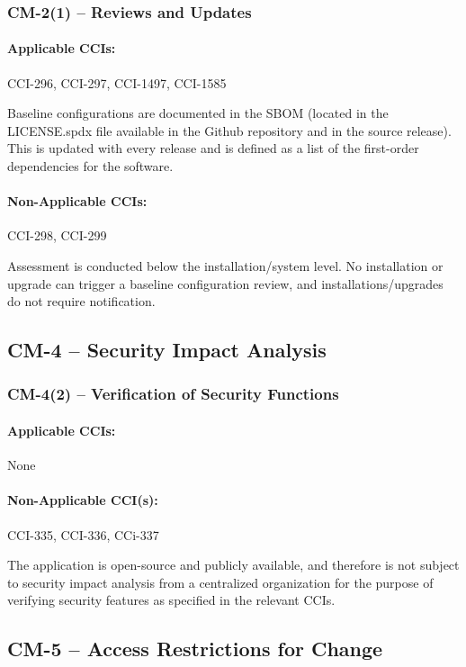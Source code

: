 \documentclass[letterpaper, 10pt, twoside]{article}
\begin{document}
\subsubsection{CM-2(1) -- Reviews and Updates}

\paragraph{Applicable CCIs:} CCI-296, CCI-297, CCI-1497, CCI-1585

Baseline configurations are documented in the SBOM (located in the LICENSE.spdx file available in the Github repository and in the source release). This is updated with every release and is defined as a list of the first-order dependencies for the software.

\paragraph{Non-Applicable CCIs:} CCI-298, CCI-299

Assessment is conducted below the installation/system level. No installation or upgrade can trigger a baseline configuration review, and installations/upgrades do not require notification.

\subsection{CM-4 -- Security Impact Analysis}

\subsubsection {CM-4(2) -- Verification of Security Functions}

\paragraph{Applicable CCIs:} None

\paragraph{Non-Applicable CCI(s):} CCI-335, CCI-336, CCi-337

The application is open-source and publicly available, and therefore is not subject to security impact analysis from a centralized organization for the purpose of verifying security features as specified in the relevant CCIs.

\subsection{CM-5 -- Access Restrictions for Change}
\end{document}

